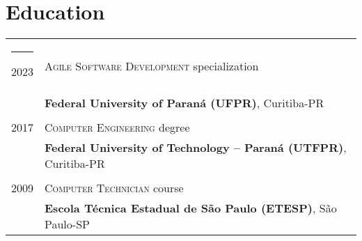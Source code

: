 \documentclass[a4paper,11pt]{article}
\begin{document}
\begin{tabular}{r|p{14.3cm}}

\end{tabular}

\section{Education}
\begin{tabular}{rl}




\rule{2cm}{0pt} 2023 & \textsc{Agile Software Development} specialization \\ &\normalsize\textbf{Federal University of Paraná (UFPR)}, Curitiba-PR\\&\\
2017 & \textsc{Computer Engineering} degree \\ &\normalsize\textbf{Federal University of Technology – Paraná (UTFPR)}, Curitiba-PR\\&\\
2009 & \textsc{Computer Technician} course \\ &\normalsize\textbf{Escola Técnica Estadual de São Paulo (ETESP)}, São Paulo-SP
\end{tabular}
\end{document}
